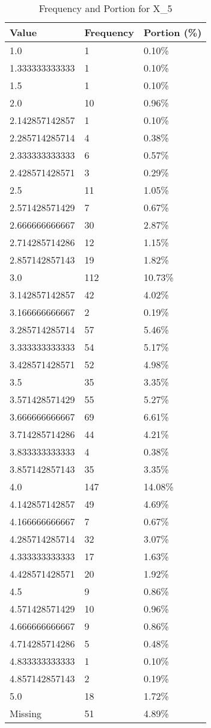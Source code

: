 \begin{table}[H]
\centering
\begin{tabular}{|l|l|l|}
\hline
\textbf{Value} & \textbf{Frequency} & \textbf{Portion (\%)} \\ \hline
1.0 & 1 & 0.10\% \\ \hline
1.333333333333 & 1 & 0.10\% \\ \hline
1.5 & 1 & 0.10\% \\ \hline
2.0 & 10 & 0.96\% \\ \hline
2.142857142857 & 1 & 0.10\% \\ \hline
2.285714285714 & 4 & 0.38\% \\ \hline
2.333333333333 & 6 & 0.57\% \\ \hline
2.428571428571 & 3 & 0.29\% \\ \hline
2.5 & 11 & 1.05\% \\ \hline
2.571428571429 & 7 & 0.67\% \\ \hline
2.666666666667 & 30 & 2.87\% \\ \hline
2.714285714286 & 12 & 1.15\% \\ \hline
2.857142857143 & 19 & 1.82\% \\ \hline
3.0 & 112 & 10.73\% \\ \hline
3.142857142857 & 42 & 4.02\% \\ \hline
3.166666666667 & 2 & 0.19\% \\ \hline
3.285714285714 & 57 & 5.46\% \\ \hline
3.333333333333 & 54 & 5.17\% \\ \hline
3.428571428571 & 52 & 4.98\% \\ \hline
3.5 & 35 & 3.35\% \\ \hline
3.571428571429 & 55 & 5.27\% \\ \hline
3.666666666667 & 69 & 6.61\% \\ \hline
3.714285714286 & 44 & 4.21\% \\ \hline
3.833333333333 & 4 & 0.38\% \\ \hline
3.857142857143 & 35 & 3.35\% \\ \hline
4.0 & 147 & 14.08\% \\ \hline
4.142857142857 & 49 & 4.69\% \\ \hline
4.166666666667 & 7 & 0.67\% \\ \hline
4.285714285714 & 32 & 3.07\% \\ \hline
4.333333333333 & 17 & 1.63\% \\ \hline
4.428571428571 & 20 & 1.92\% \\ \hline
4.5 & 9 & 0.86\% \\ \hline
4.571428571429 & 10 & 0.96\% \\ \hline
4.666666666667 & 9 & 0.86\% \\ \hline
4.714285714286 & 5 & 0.48\% \\ \hline
4.833333333333 & 1 & 0.10\% \\ \hline
4.857142857143 & 2 & 0.19\% \\ \hline
5.0 & 18 & 1.72\% \\ \hline
Missing & 51 & 4.89\% \\ \hline
\end{tabular}
\caption{Frequency and Portion for X_5}
\end{table}

